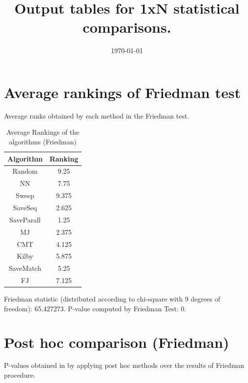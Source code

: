 \documentclass[a4paper,10pt]{article}
\title{Output tables for 1xN statistical comparisons.}
\author{}
\date{\today}
\begin{document}
\begin{landscape}
\pagestyle{empty}
\maketitle
\thispagestyle{empty}

\section{Average rankings of Friedman test}


Average ranks obtained by each method in the Friedman test.

\begin{table}[!htp]
\centering
\begin{tabular}{|c|c|}\hline
Algorithm&Ranking\\\hline
Random&9.25\\NN&7.75\\Sweep&9.375\\SaveSeq&2.625\\SaveParall&1.25\\MJ&2.375\\CMT&4.125\\Kilby&5.875\\SaveMatch&5.25\\FJ&7.125\\\hline\end{tabular}
\caption{Average Rankings of the algorithms (Friedman)}
\end{table}

Friedman statistic (distributed according to chi-square with 9 degrees of freedom): 65.427273. \newline P-value computed by Friedman Test: 0.\newline


\newpage

\section{Post hoc comparison (Friedman)}


P-values obtained in by applying post hoc methods over the results of Friedman procedure.


\end{landscape}
\end{document}
